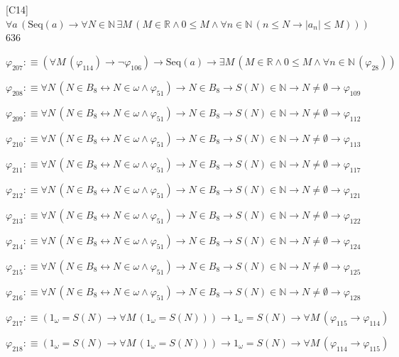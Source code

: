 \begin{fullproof}{[C14]}{$\forall a\,(\mathrm{Seq}(a) \to \forall N \in \mathbb{N}\,\exists M\,(M \in \mathbb{R} \land 0 \leq M \land \forall n \in \mathbb{N}\,(n \leq N \to \lvert a_{n} \rvert \leq M)))$}{636}
\begin{abbrevlist}
\item $\varphi_{207} :\equiv (\forall M\,(\varphi_{114}) \to \neg \varphi_{106}) \to \mathrm{Seq}(a) \to \exists M\,(M \in \mathbb{R} \land 0 \leq M \land \forall n \in \mathbb{N}\,(\varphi_{28}))$
\item $\varphi_{208} :\equiv \forall N\,(N \in B_{8} \leftrightarrow N \in \omega \land \varphi_{51}) \to N \in B_{8} \to S(N) \in \mathbb{N} \to N \neq \emptyset \to \varphi_{109}$
\item $\varphi_{209} :\equiv \forall N\,(N \in B_{8} \leftrightarrow N \in \omega \land \varphi_{51}) \to N \in B_{8} \to S(N) \in \mathbb{N} \to N \neq \emptyset \to \varphi_{112}$
\item $\varphi_{210} :\equiv \forall N\,(N \in B_{8} \leftrightarrow N \in \omega \land \varphi_{51}) \to N \in B_{8} \to S(N) \in \mathbb{N} \to N \neq \emptyset \to \varphi_{113}$
\item $\varphi_{211} :\equiv \forall N\,(N \in B_{8} \leftrightarrow N \in \omega \land \varphi_{51}) \to N \in B_{8} \to S(N) \in \mathbb{N} \to N \neq \emptyset \to \varphi_{117}$
\item $\varphi_{212} :\equiv \forall N\,(N \in B_{8} \leftrightarrow N \in \omega \land \varphi_{51}) \to N \in B_{8} \to S(N) \in \mathbb{N} \to N \neq \emptyset \to \varphi_{121}$
\item $\varphi_{213} :\equiv \forall N\,(N \in B_{8} \leftrightarrow N \in \omega \land \varphi_{51}) \to N \in B_{8} \to S(N) \in \mathbb{N} \to N \neq \emptyset \to \varphi_{122}$
\item $\varphi_{214} :\equiv \forall N\,(N \in B_{8} \leftrightarrow N \in \omega \land \varphi_{51}) \to N \in B_{8} \to S(N) \in \mathbb{N} \to N \neq \emptyset \to \varphi_{124}$
\item $\varphi_{215} :\equiv \forall N\,(N \in B_{8} \leftrightarrow N \in \omega \land \varphi_{51}) \to N \in B_{8} \to S(N) \in \mathbb{N} \to N \neq \emptyset \to \varphi_{125}$
\item $\varphi_{216} :\equiv \forall N\,(N \in B_{8} \leftrightarrow N \in \omega \land \varphi_{51}) \to N \in B_{8} \to S(N) \in \mathbb{N} \to N \neq \emptyset \to \varphi_{128}$
\item $\varphi_{217} :\equiv (1_{\omega} = S(N) \to \forall M\,(1_{\omega} = S(N))) \to 1_{\omega} = S(N) \to \forall M\,(\varphi_{115} \to \varphi_{114})$
\item $\varphi_{218} :\equiv (1_{\omega} = S(N) \to \forall M\,(1_{\omega} = S(N))) \to 1_{\omega} = S(N) \to \forall M\,(\varphi_{114} \to \varphi_{115})$

\end{abbrevlist}
\end{fullproof}
